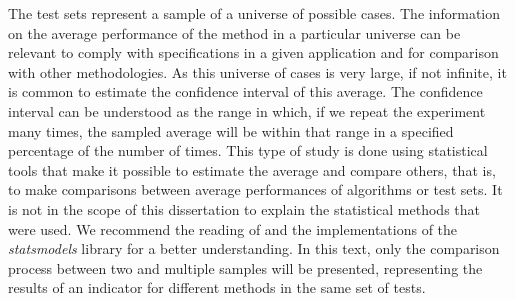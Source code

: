 				The test sets represent a sample of a universe of possible cases. The information on the average performance of the method in a particular universe can be relevant to comply with specifications in a given application and for comparison with other methodologies. As this universe of cases is very large, if not infinite, it is common to estimate the confidence interval of this average. The confidence interval can be understood as the range in which, if we repeat the experiment many times, the sampled average will be within that range in a specified percentage of the number of times. This type of study is done using statistical tools that make it possible to estimate the average and compare others, that is, to make comparisons between average performances of algorithms or test sets. It is not in the scope of this dissertation to explain the statistical methods that were used. We recommend the reading of \citep{montgomery2010applied} and the implementations of the \textit{statsmodels} library \citep{seabold2010statsmodels} for a better understanding. In this text, only the comparison process between two and multiple samples will be presented, representing the results of an indicator for different methods in the same set of tests.
				
